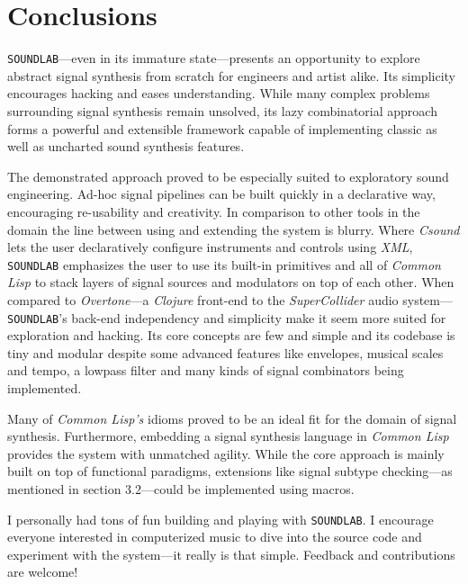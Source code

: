 \section{Conclusions}

\texttt{SOUNDLAB}---even in its immature state---presents an opportunity
to explore abstract signal synthesis from scratch for engineers and artist
alike. Its simplicity encourages hacking and eases understanding. While
many complex problems surrounding signal synthesis remain unsolved, its
lazy combinatorial approach forms a powerful and extensible framework
capable of implementing classic as well as uncharted sound synthesis
features.

The demonstrated approach proved to be especially suited to exploratory
sound engineering. Ad-hoc signal pipelines can be built quickly in a
declarative way, encouraging re-usability and creativity. In comparison to
other tools in the domain the line between using and extending the system
is blurry. Where \textit{Csound} lets the user declaratively configure
instruments and controls using \textit{XML}, \texttt{SOUNDLAB} emphasizes
the user to use its built-in primitives and all of \textit{Common Lisp}
to stack layers of signal sources and modulators on top of each other.  
When compared to \textit{Overtone}---a \textit{Clojure} front-end to the
\textit{SuperCollider} audio system---\texttt{SOUNDLAB}'s back-end
independency and simplicity make it seem more suited for exploration and
hacking. Its core concepts are few and simple and its codebase is tiny
and modular despite some advanced features like envelopes, musical scales
and tempo, a lowpass filter and many kinds of signal combinators being
implemented.

Many of \textit{Common Lisp's} idioms proved to be an ideal
fit for the domain of signal synthesis. Furthermore, embedding a signal
synthesis language in \textit{Common Lisp} provides the system with
unmatched agility. While the core approach is mainly built on top of
functional paradigms, extensions like signal subtype checking---as
mentioned in section 3.2---could be implemented using macros.

I personally had tons of fun building and playing with
\texttt{SOUND\-LAB}. I encourage everyone interested in computerized
music to dive into the source code and experiment with the system---it
really is that simple. Feedback and contributions are welcome!
